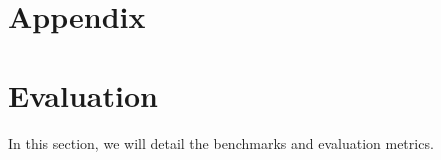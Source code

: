 \appendix
\section*{Appendix}




\section{Evaluation}
\label{appendix:eva}

In this section, we will detail the benchmarks and evaluation metrics.

